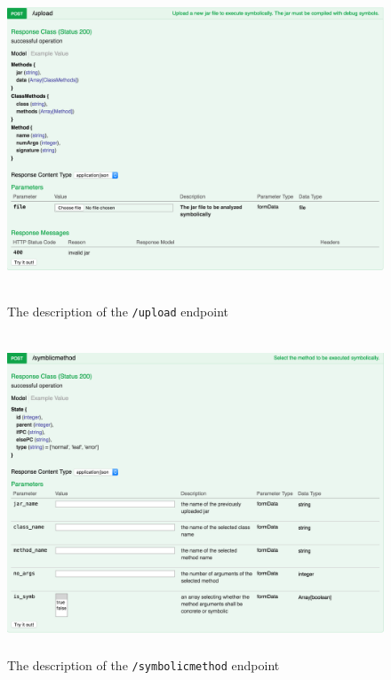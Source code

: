 \documentclass[titlepage,11pt]{article}
\begin{document}
\begin{figure}
\centering
\includegraphics[width=450pt, height=270pt]{upload_controller.png}
\caption{The description of the \texttt{/upload} endpoint}
\label{fig:upload}
\end{figure}

\begin{figure}
\centering
\includegraphics[width=450pt, height=270pt]{symbolic_method_controller.png}
\caption{The description of the \texttt{/symbolicmethod} endpoint}
\label{fig:symbolicmethod}
\end{figure}
\end{document}
